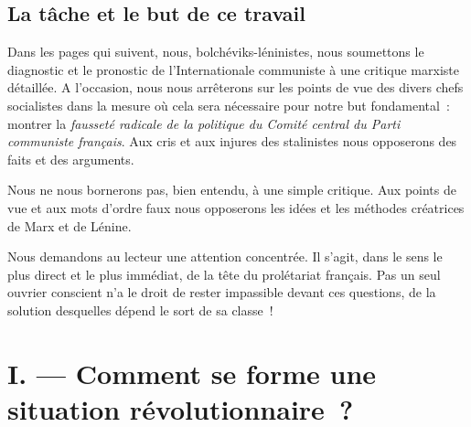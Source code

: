 \documentclass[french,twoside]{book} %
\begin{document}
 \subsection[{La tâche et le but de ce travail}]{La tâche et le but de ce travail}
\noindent Dans les pages qui suivent, nous, bolchéviks-léninistes, nous soumettons le diagnostic et le pronostic de l’Internationale communiste à une critique marxiste détaillée. A l’occasion, nous nous arrêterons sur les points de vue des divers chefs socialistes dans la mesure où cela sera nécessaire pour notre but fondamental : montrer la \emph{fausseté radicale de la politique du Comité central du Parti communiste français}. Aux cris et aux injures des stalinistes nous opposerons des faits et des arguments.\par
Nous ne nous bornerons pas, bien entendu, à une simple critique. Aux points de vue et aux mots d’ordre faux nous opposerons les idées et les méthodes créatrices de Marx et de Lénine.\par
Nous demandons au lecteur une attention concentrée. Il s’agit, dans le sens le plus direct et le plus immédiat, de la tête du prolétariat français. Pas un seul ouvrier conscient n’a le droit de rester impassible devant ces questions, de la solution desquelles dépend le sort de sa classe !
\section[{I. — Comment se forme une situation révolutionnaire ?}]{I. — Comment se forme une situation révolutionnaire ?}
\end{document}
